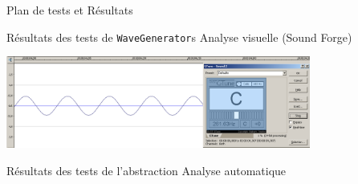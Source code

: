 \documentclass[frenchb]{beamer}
\begin{document}
\begin{frame}{Plan de tests et Résultats}
    \begin{block}{Résultats des tests de \texttt{WaveGenerator}s}
        Analyse visuelle (Sound Forge)
        \begin{center}
            \includegraphics[width=10cm]{../img/png/testWaveGeneratorSinus.png}
        \end{center}
    \end{block}

    \begin{block}{Résultats des tests de l'abstraction}
        Analyse automatique
    \end{block}
\end{frame}
\end{document}
